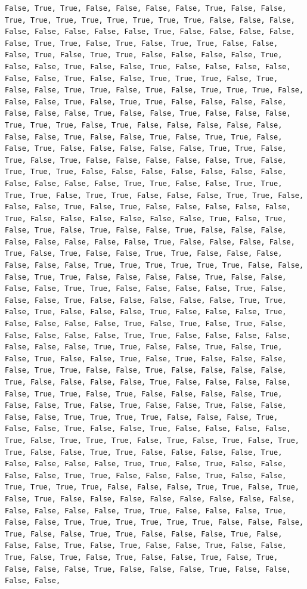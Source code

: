 \documentclass[
  letterpaper,
  DIV=11,
  numbers=noendperiod]{scrartcl}
\begin{document}
\begin{verbatim}
False, True, True, False, False, False, False, True, False, False, True, True, True, True, True, True, True, True, False, False, False, False, False, False, False, False, True, False, False, False, False, False, True, True, False, True, False, True, True, False, False, False, True, False, True, True, False, False, False, False, True, False, False, True, False, False, True, False, False, False, False, False, False, True, False, False, True, True, True, False, True, False, False, True, True, False, True, False, True, True, True, False, False, False, True, False, True, True, False, False, False, False, False, False, False, True, False, False, True, False, False, False, True, True, True, False, True, False, False, False, False, False, False, False, True, False, False, True, False, True, True, False, False, True, False, False, False, False, False, True, True, False, True, False, True, False, False, False, False, False, True, False, True, True, True, False, False, False, False, False, False, False, False, False, False, False, True, True, False, False, True, True, True, True, False, True, True, False, False, False, True, True, False, False, False, True, False, True, False, False, False, False, False, True, False, False, False, False, False, False, True, False, True, False, True, False, True, False, False, True, False, False, False, False, False, False, False, False, True, False, False, False, False, True, False, True, False, False, True, True, False, False, False, False, False, False, True, True, True, True, True, True, False, False, False, True, True, False, False, False, False, True, False, False, False, False, True, True, False, False, False, False, True, False, False, False, True, False, False, False, False, False, True, True, False, True, False, False, False, True, False, False, False, True, False, False, False, False, True, False, True, False, True, False, False, False, False, False, True, True, False, False, False, False, False, False, False, True, True, False, False, True, False, True, False, True, False, False, True, False, True, False, False, False, False, True, True, False, False, True, False, False, False, False, True, False, False, False, False, True, False, False, False, False, False, True, True, False, True, False, False, False, False, True, False, False, True, False, True, False, False, True, False, False, False, False, True, True, True, True, False, False, False, True, False, False, True, False, False, True, False, False, False, False, True, False, True, True, True, False, True, False, True, False, True, True, False, False, True, True, False, False, False, False, True, False, False, False, False, True, True, False, True, False, False, False, False, True, True, False, False, False, True, False, False, True, True, True, True, False, False, False, True, True, False, True, False, True, False, False, False, False, False, False, False, False, False, False, False, False, True, True, False, False, False, True, False, False, True, True, True, True, True, True, False, False, False, True, False, False, True, True, False, False, False, True, False, False, False, True, False, True, False, False, True, False, False, True, False, True, False, True, False, False, True, False, True, False, False, False, True, False, False, False, True, False, False, False, False, 
\end{verbatim}
\end{document}
